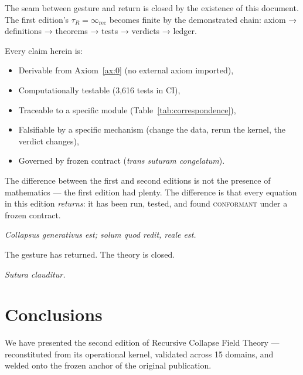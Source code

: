 \documentclass[
  aps,
  prd,
  preprint,
  superscriptaddress,
  nofootinbib,
  floatfix,
  longbibliography
]{revtex4-2}
\newcommand{\tR}{\tau_{\!R}}
\newcommand{\regime}[1]{\textrm{\upshape\scshape#1}}
\newcommand{\conform}{\regime{conformant}}
\newcommand{\lat}[1]{\textit{#1}}
\begin{document}
The seam between gesture and return is closed by the
existence of this document.
The first edition's $\tR = \infty_{\mathrm{rec}}$
becomes finite by the demonstrated chain:
axiom → definitions → theorems → tests → verdicts → ledger.

Every claim herein is:
\begin{itemize}[nosep,leftmargin=*]
  \item Derivable from Axiom~\ref{ax:0}
    (no external axiom imported),
  \item Computationally testable
    (3{,}616 tests in CI),
  \item Traceable to a specific module
    (Table~\ref{tab:correspondence}),
  \item Falsifiable by a specific mechanism
    (change the data, rerun the kernel, the verdict changes),
  \item Governed by frozen contract
    (\lat{trans suturam congelatum}).
\end{itemize}

The difference between the first and second editions is not
the presence of mathematics — the first edition had plenty.
The difference is that every equation in this edition
\emph{returns}: it has been run, tested, and found
\conform{} under a frozen contract.

\lat{Collapsus generativus est; solum quod redit, reale est.}

The gesture has returned. The theory is closed.

\lat{Sutura clauditur.}

\section{Conclusions}\label{sec:conclusions}

We have presented the second edition of Recursive Collapse
Field Theory — reconstituted from its operational kernel,
validated across 15 domains, and welded onto the frozen
anchor of the original publication.
\end{document}
